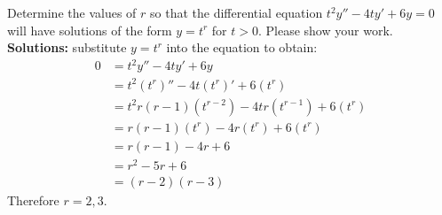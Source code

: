 \ifnum {}
\question[2] Determine the values of $r$ so that the differential equation $\displaystyle t^2y'' -4ty' +6y =0$ will have solutions of the form $\displaystyle y = t^r$ for $t>0$. Please show your work.
\ifnum {} {\color{DarkGreen} \\[12pt] 
\textbf{Solutions:} substitute $y=t^r$ into the equation to obtain:
\begin{align}
    0 &= t^2y'' -4ty' +6y \\
    &= t^2(t^r)'' - 4t(t^r)' + 6(t^r) \\ 
    &= t^2r(r-1)(t^{r-2}) - 4tr(t^{r-1}) + 6(t^r) \\ 
    &= r(r-1)(t^{r}) - 4r(t^{r}) + 6(t^r) \\ 
    &= r(r-1) - 4r + 6 \\ 
    &= r^2 - 5r + 6 \\ 
    &= (r-2)(r-3) 
\end{align}
Therefore $r=2,3$. 
} 
\else 
\fi\fi 

\ifnum {}
\fi


\ifnum {}
\fi

\ifnum {}
\fi


\ifnum {}
\fi

